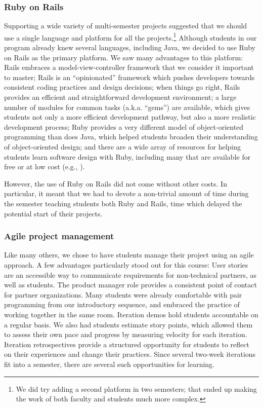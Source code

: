 
\subsubsection{Ruby on Rails}

Supporting a wide variety of multi-semester projects suggested that
we should use a single language and platform for all the
projects.\footnote{We did try adding a second platform in two
semesters; that ended up making the work of both faculty and students
much more complex.}  Although students in our program already knew
several languages, including Java, we decided to use Ruby on
Rails as the primary platform.  We saw many advantages to this
platform: Rails embraces a model-view-controller framework that we
consider it important to master; Rails is an ``opinionated'' framework 
which pushes developers towards consistent coding practices and 
design decisions; when things go right, Rails
provides an efficient and straightforward development environment;
a large number of modules for common tasks (a.k.a. ``gems'') are
available, which gives students not only a more efficient development
pathway, but also a more realistic development process; Ruby
provides a very different model of object-oriented programming than
does Java, which helped students broaden their understanding of
object-oriented design; and there are a wide array of resources for
helping students learn software design with Ruby, including many
that are available for free or at low cost (e.g.,
\cite{saasbook,rails-tutorial}).

However, the use of Ruby on Rails did not come without other costs.  In
particular, it meant that we had to devote a non-trivial amount of
time during the semester teaching students both Ruby and Rails, time
which delayed the potential start of their projects.

\subsubsection{Agile project management}

Like many others, we chose to have students manage their project using an 
agile approach.  A few advantages particularly stood out
for this course: User stories are an accessible way to communicate
requirements for non-technical partners, as well as students. 
The product manager role provides a consistent point of contact for partner 
organizations.
Many students were already comfortable with pair programming from our 
introductory sequence, and embraced the 
practice of working together in the same room.
Iteration demos hold students accountable on a regular basis.  
We also had students estimate story points, which allowed them to assess 
their own pace and progress by measuring velocity for each iteration.
Iteration retrospectives provide a structured opportunity for students 
to reflect on their experiences and change their practices.  
Since several two-week iterations fit into a 
semester, there are several such opportunities for learning.

